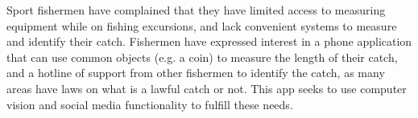 Sport fishermen have complained that they have limited access to measuring equipment while on fishing excursions, and lack convenient systems to measure and identify their catch. Fishermen have expressed interest in a phone application that can use common objects (e.g. a coin) to measure the length of their catch, and a hotline of support from other fishermen to identify the catch, as many areas have laws on what is a lawful catch or not. This app seeks to use computer vision and social media functionality to fulfill these needs.